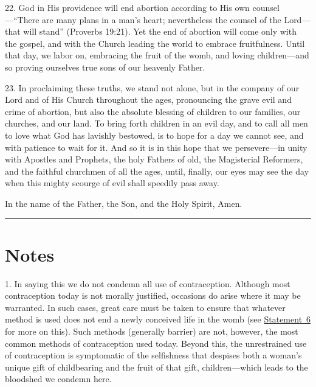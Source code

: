 \documentclass[
]{book}
\begin{document}
\protect\hypertarget{dda-statement-22}{\href{}{}}22. God in His providence will end abortion according to His own counsel---``There are many plans in a man's heart; nevertheless the counsel of the Lord---that will stand'' (Proverbs 19:21). Yet the end of abortion will come only with the gospel, and with the Church leading the world to embrace fruitfulness. Until that day, we labor on, embracing the fruit of the womb, and loving children---and so proving ourselves true sons of our heavenly Father.

\protect\hypertarget{dda-statement-23}{\href{}{}}23. In proclaiming these truths, we stand not alone, but in the company of our Lord and of His Church throughout the ages, pronouncing the grave evil and crime of abortion, but also the absolute blessing of children to our families, our churches, and our land. To bring forth children in an evil day, and to call all men to love what God has lavishly bestowed, is to hope for a day we cannot see, and with patience to wait for it. And so it is in this hope that we persevere---in unity with Apostles and Prophets, the holy Fathers of old, the Magisterial Reformers, and the faithful churchmen of all the ages, until, finally, our eyes may see the day when this mighty scourge of evil shall speedily pass away.

In the name of the Father, the Son, and the Holy Spirit, Amen.

\begin{center}\rule{0.5\linewidth}{0.5pt}\end{center}

\hypertarget{notes-1}{%
\section*{Notes}\label{notes-1}}

1. In saying this we do not condemn all use of contraception. Although most contraception today is not morally justified, occasions do arise where it may be warranted. In such cases, great care must be taken to ensure that whatever method is used does not end a newly conceived life in the womb (see \protect\hyperlink{statement-06}{Statement~6} for more on this). Such methods (generally barrier) are not, however, the most common methods of contraception used today. Beyond this, the unrestrained use of contraception is symptomatic of the selfishness that despises both a woman's unique gift of childbearing and the fruit of that gift, children---which leads to the bloodshed we condemn here.
\end{document}
